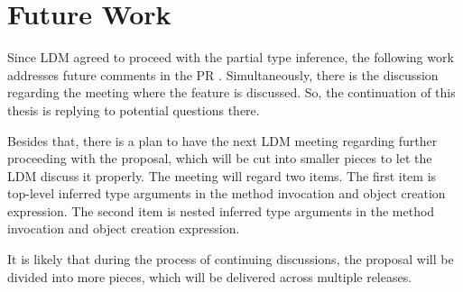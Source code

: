 \chapter{Future Work} \label{sect14:future}

Since LDM agreed to proceed with the partial type inference, the following work addresses future comments in the PR \cite{online:pull2}. 
Simultaneously, there is the discussion \cite{online:mettingSummaryDisc} regarding the meeting where the feature is discussed. 
So, the continuation of this thesis is replying to potential questions there.
\par
Besides that, there is a plan to have the next LDM meeting regarding further proceeding with the proposal, which will be cut into smaller pieces to let the LDM discuss it properly. 
The meeting will regard two items.
The first item is top-level inferred type arguments in the method invocation and object creation expression. 
The second item is nested inferred type arguments in the method invocation and object creation expression.
\par
It is likely that during the process of continuing discussions, the proposal will be divided into more pieces, which will be delivered across multiple releases.